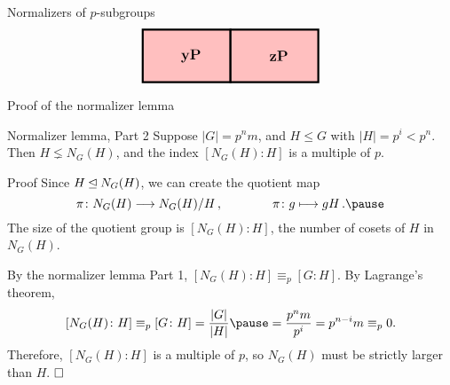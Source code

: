 \documentclass[8pt]{beamer}
\newcommand{\Pause}{\pause}      %
\begin{document}
\begin{frame}{Normalizers of $p$-subgroups}
\[\begin{tikzpicture}[scale=.5]
\begin{scope}[shift={(12.5,0)}]
\begin{scope}[shift={(5,0)}]
      \end{scope}
      \begin{scope}[shift={(0,-3)}]
        \draw[color=boxRed,fill=boxRed] (0,0) rectangle (5,3);
        \draw[ultra thick] (0,0) rectangle (5,3);
        \node at (2.75,1.5) {\large\bf $\mathbf{yP}$};
      \end{scope}
      \begin{scope}[shift={(5,-3)}]
        \draw[color=boxRed,fill=boxRed] (0,0) rectangle (5,3);
        \draw[ultra thick] (0,0) rectangle (5,3);
        \node at (2.75,1.5) {\large\bf $\mathbf{zP}$};
      \end{scope}
    \end{scope}
  \end{tikzpicture}
  \]
  
\end{frame}


\begin{frame}{Proof of the normalizer lemma}

  \begin{block}{Normalizer lemma, Part 2} 
    Suppose $|G|=p^nm$, and $H\leq G$ with $|H|=p^i<p^n$. Then $H\lneq
    N_G(H)$, and the index $[N_G(H):H]$ is a multiple of $p$. 
  \end{block}

  \begin{exampleblock}{Proof} 
    Since $H\unlhd N_G(H)$, we can create the quotient map 
    \[
    \pi\colon N_G(H)\longrightarrow N_G(H)/H\,,\qquad\qquad \pi\colon
    g\longmapsto gH\,. \Pause
    \]
    The size of the quotient group is $[N_G(H)\colon H]$, the number of
    cosets of $H$ in $N_G(H)$.
    
    \pause\bigskip
    
    By the normalizer lemma Part 1, $[N_G(H)\colon H]\equiv_p[G\colon
      H]$. \Pause By Lagrange's theorem, %
    \[
    [N_G(H)\colon H]\equiv_p[G\colon
      H]=\frac{|G|}{|H|}\Pause=\frac{p^nm}{p^i}=p^{n-i}m\equiv_p 0.
    \]
    \pause Therefore, $[N_G(H)\colon H]$ is a multiple of $p$, so $N_G(H)$
    must be strictly larger than $H$. $\hfill\Box$
  \end{exampleblock}
  
\end{frame}

\end{document}
